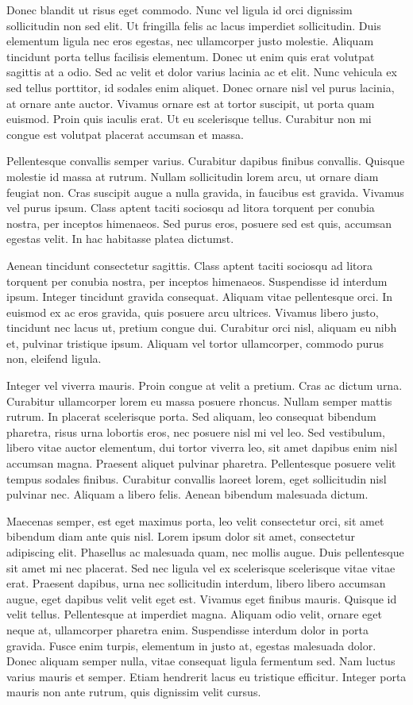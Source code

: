 Donec blandit ut risus eget commodo. Nunc vel ligula id orci dignissim sollicitudin non sed elit. Ut fringilla felis ac lacus imperdiet sollicitudin. Duis elementum ligula nec eros egestas, nec ullamcorper justo molestie. Aliquam tincidunt porta tellus facilisis elementum. Donec ut enim quis erat volutpat sagittis at a odio. Sed ac velit et dolor varius lacinia ac et elit. Nunc vehicula ex sed tellus porttitor, id sodales enim aliquet. Donec ornare nisl vel purus lacinia, at ornare ante auctor. Vivamus ornare est at tortor suscipit, ut porta quam euismod. Proin quis iaculis erat. Ut eu scelerisque tellus. Curabitur non mi congue est volutpat placerat accumsan et massa.

Pellentesque convallis semper varius. Curabitur dapibus finibus convallis. Quisque molestie id massa at rutrum. Nullam sollicitudin lorem arcu, ut ornare diam feugiat non. Cras suscipit augue a nulla gravida, in faucibus est gravida. Vivamus vel purus ipsum. Class aptent taciti sociosqu ad litora torquent per conubia nostra, per inceptos himenaeos. Sed purus eros, posuere sed est quis, accumsan egestas velit. In hac habitasse platea dictumst.

Aenean tincidunt consectetur sagittis. Class aptent taciti sociosqu ad litora torquent per conubia nostra, per inceptos himenaeos. Suspendisse id interdum ipsum. Integer tincidunt gravida consequat. Aliquam vitae pellentesque orci. In euismod ex ac eros gravida, quis posuere arcu ultrices. Vivamus libero justo, tincidunt nec lacus ut, pretium congue dui. Curabitur orci nisl, aliquam eu nibh et, pulvinar tristique ipsum. Aliquam vel tortor ullamcorper, commodo purus non, eleifend ligula.

Integer vel viverra mauris. Proin congue at velit a pretium. Cras ac dictum urna. Curabitur ullamcorper lorem eu massa posuere rhoncus. Nullam semper mattis rutrum. In placerat scelerisque porta. Sed aliquam, leo consequat bibendum pharetra, risus urna lobortis eros, nec posuere nisl mi vel leo. Sed vestibulum, libero vitae auctor elementum, dui tortor viverra leo, sit amet dapibus enim nisl accumsan magna. Praesent aliquet pulvinar pharetra. Pellentesque posuere velit tempus sodales finibus. Curabitur convallis laoreet lorem, eget sollicitudin nisl pulvinar nec. Aliquam a libero felis. Aenean bibendum malesuada dictum.

Maecenas semper, est eget maximus porta, leo velit consectetur orci, sit amet bibendum diam ante quis nisl. Lorem ipsum dolor sit amet, consectetur adipiscing elit. Phasellus ac malesuada quam, nec mollis augue. Duis pellentesque sit amet mi nec placerat. Sed nec ligula vel ex scelerisque scelerisque vitae vitae erat. Praesent dapibus, urna nec sollicitudin interdum, libero libero accumsan augue, eget dapibus velit velit eget est. Vivamus eget finibus mauris. Quisque id velit tellus. Pellentesque at imperdiet magna. Aliquam odio velit, ornare eget neque at, ullamcorper pharetra enim. Suspendisse interdum dolor in porta gravida. Fusce enim turpis, elementum in justo at, egestas malesuada dolor. Donec aliquam semper nulla, vitae consequat ligula fermentum sed. Nam luctus varius mauris et semper. Etiam hendrerit lacus eu tristique efficitur. Integer porta mauris non ante rutrum, quis dignissim velit cursus.

